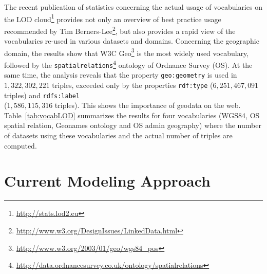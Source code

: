 The recent publication of statistics concerning the actual usage of vocabularies on the LOD cloud\footnote{\url{http://stats.lod2.eu}} provides not only an overview of best practice usage recommended by Tim Berners-Lee\footnote{\url{http://www.w3.org/DesignIssues/LinkedData.html}}, but also provides a rapid view of the vocabularies re-used in various datasets and domains. Concerning the geographic domain, the results show that W3C Geo\footnote{\url{http://www.w3.org/2003/01/geo/wgs84_pos}} is the most widely used vocabulary, followed by the \texttt{spatialrelations}\footnote{\url{http://data.ordnancesurvey.co.uk/ontology/spatialrelations}} ontology of Ordnance Survey (OS). At the same time, the analysis reveals that the property \texttt{geo:geometry} is used in $1,322,302,221$ triples, exceeded only by the properties \texttt{rdf:type} ($6,251,467,091$ triples) and \texttt{rdfs:label}\\($1,586,115,316$ triples). This shows the importance of geodata on the web. Table~\ref{tab:vocabLOD} summarizes the results for four vocabularies (WGS84, OS spatial relation, Geonames ontology and OS admin geography) where the number of datasets using these vocabularies and the actual number of triples are computed.
\begin{table}[!htbp]
\end{table}

\section{Current Modeling Approach}

